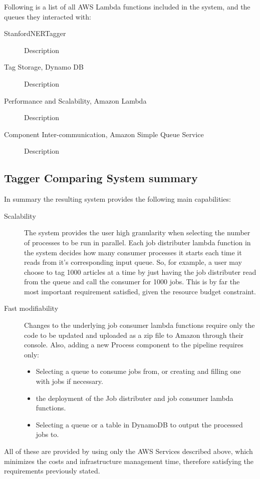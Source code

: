 Following is a list of all AWS Lambda functions included in the system, and the queues they interacted with:
\begin{description}
\item[StanfordNERTagger] Description
\item[Tag Storage, Dynamo DB] Description
\item[Performance and Scalability, Amazon Lambda] Description
\item[Component Inter-communication, Amazon Simple Queue Service] Description
\end{description}

 
\subsection{Tagger Comparing System summary}
In summary the resulting system provides the following main capabilities:
\begin{description}
\item[Scalability]
The system provides the user high granularity when selecting the number of processes to be run in parallel.
Each job distributer lambda function in the system decides how many consumer processes it starts each time it reads from it's corresponding input queue. 
So, for example, a user may choose to tag 1000 articles at a time by just having the job distributer read from the queue and call the consumer for 1000 jobs.
This is by far the most important requirement satisfied, given the resource budget constraint.
\item[Fast modifiability]
Changes to the underlying job consumer lambda functions require only the code to be updated and uploaded as a zip file to Amazon through their console.
Also, adding a new Process component to the pipeline requires only:
  \begin{itemize}
  \item
  Selecting a queue to consume jobs from, or creating and filling one with jobs if necessary.
  \item
  the deployment of the Job distributer and job consumer lambda functions.
  \item
  Selecting a queue or a table in DynamoDB to output the processed jobs to.
  \end{itemize}
\end{description}
All of these are provided by using only the AWS Services described above, which  minimizes the costs and infrastructure management time,
therefore satisfying the requirements previously stated. 

